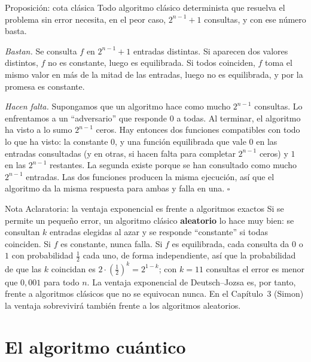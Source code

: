 \documentclass[11pt, a4paper, twoside, openright]{report}
\begin{document}
\begin{teoria}{Proposición: cota clásica}
Todo algoritmo clásico determinista que resuelva el problema sin error necesita, en el peor caso, $2^{n-1}+1$ consultas, y con ese número basta.
\end{teoria}

\begin{demo}
\textit{Bastan.} Se consulta $f$ en $2^{n-1}+1$ entradas distintas. Si aparecen dos valores distintos, $f$ no es constante, luego es equilibrada. Si todos coinciden, $f$ toma el mismo valor en más de la mitad de las entradas, luego no es equilibrada, y por la promesa es constante.

\textit{Hacen falta.} Supongamos que un algoritmo hace como mucho $2^{n-1}$ consultas. Lo enfrentamos a un ``adversario'' que responde $0$ a todas. Al terminar, el algoritmo ha visto a lo sumo $2^{n-1}$ ceros. Hay entonces dos funciones compatibles con todo lo que ha visto: la constante $0$, y una función equilibrada que vale $0$ en las entradas consultadas (y en otras, si hacen falta para completar $2^{n-1}$ ceros) y $1$ en las $2^{n-1}$ restantes. La segunda existe porque se han consultado como mucho $2^{n-1}$ entradas. Las dos funciones producen la misma ejecución, así que el algoritmo da la misma respuesta para ambas y falla en una. \hfill$\square$
\end{demo}

\begin{aclaracion}{Nota Aclaratoria: la ventaja exponencial es frente a algoritmos exactos}
Si se permite un pequeño error, un algoritmo clásico \textbf{aleatorio} lo hace muy bien: se consultan $k$ entradas elegidas al azar y se responde ``constante'' si todas coinciden. Si $f$ es constante, nunca falla. Si $f$ es equilibrada, cada consulta da $0$ o $1$ con probabilidad $\frac12$ cada uno, de forma independiente, así que la probabilidad de que las $k$ coincidan es $2\cdot(\tfrac12)^k = 2^{1-k}$; con $k = 11$ consultas el error es menor que $0{,}001$ para todo $n$. La ventaja exponencial de Deutsch--Jozsa es, por tanto, frente a algoritmos clásicos que no se equivocan nunca. En el Capítulo~3 (Simon) la ventaja sobrevivirá también frente a los algoritmos aleatorios.
\end{aclaracion}

\cleardoublepage
\section{El algoritmo cuántico}
\end{document}
